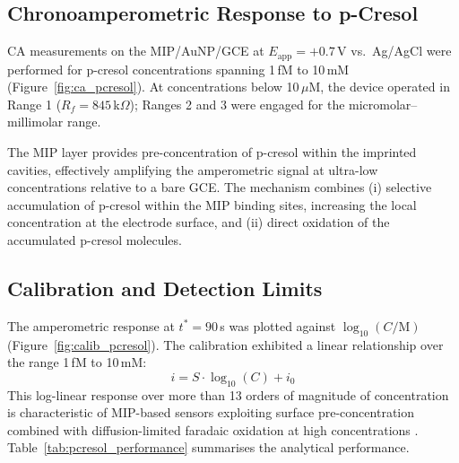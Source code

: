 
\subsection{Chronoamperometric Response to p-Cresol}

CA measurements on the MIP/AuNP/GCE at $E_\text{app} = +0.7$\,V vs.\ Ag/AgCl were performed for p-cresol concentrations spanning 1\,fM to 10\,mM (Figure~\ref{fig:ca_pcresol}). At concentrations below 10\,$\mu$M, the device operated in Range 1 ($R_f = 845$\,k$\Omega$); Ranges 2 and 3 were engaged for the micromolar--millimolar range.

The MIP layer provides pre-concentration of p-cresol within the imprinted cavities, effectively amplifying the amperometric signal at ultra-low concentrations relative to a bare GCE. The mechanism combines (i) selective accumulation of p-cresol within the MIP binding sites, increasing the local concentration at the electrode surface, and (ii) direct oxidation of the accumulated p-cresol molecules.


\subsection{Calibration and Detection Limits}

The amperometric response at $t^* = 90$\,s was plotted against $\log_{10}(C/\text{M})$ (Figure~\ref{fig:calib_pcresol}). The calibration exhibited a linear relationship over the range 1\,fM to 10\,mM:
\begin{equation}
    i = S \cdot \log_{10}(C) + i_0
\end{equation}
This log-linear response over more than 13 orders of magnitude of concentration is characteristic of MIP-based sensors exploiting surface pre-concentration combined with diffusion-limited faradaic oxidation at high concentrations \cite{Chandra2013}. Table~\ref{tab:pcresol_performance} summarises the analytical performance.


